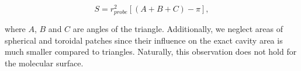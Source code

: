 \begin{equation}
  S = r_{probe}^2 \left[ \left( A + B + C \right) - \pi \right],
\end{equation}

where $A$, $B$ and $C$ are angles of the triangle. 
Additionally, we neglect areas of spherical and toroidal patches since their influence on the exact cavity area is much smaller compared to triangles.
Naturally, this observation does not hold for the molecular surface.
